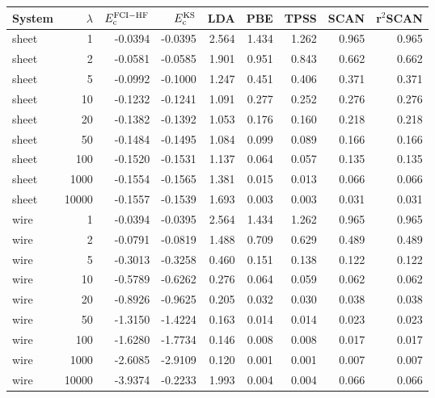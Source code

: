 \begin{tabular}{lrrrrrrrr}
\toprule
System & $\lambda$ & $E_{\rm c}^{\rm FCI-HF}$ & $E_{\rm c}^{\rm KS}$ & LDA & PBE & TPSS & SCAN & r$^2$SCAN \\
\midrule
sheet & 1 & -0.0394 & -0.0395 & 2.564 & 1.434 & 1.262 & 0.965 & 0.965 \\
sheet & 2 & -0.0581 & -0.0585 & 1.901 & 0.951 & 0.843 & 0.662 & 0.662 \\
sheet & 5 & -0.0992 & -0.1000 & 1.247 & 0.451 & 0.406 & 0.371 & 0.371 \\
sheet & 10 & -0.1232 & -0.1241 & 1.091 & 0.277 & 0.252 & 0.276 & 0.276 \\
sheet & 20 & -0.1382 & -0.1392 & 1.053 & 0.176 & 0.160 & 0.218 & 0.218 \\
sheet & 50 & -0.1484 & -0.1495 & 1.084 & 0.099 & 0.089 & 0.166 & 0.166 \\
sheet & 100 & -0.1520 & -0.1531 & 1.137 & 0.064 & 0.057 & 0.135 & 0.135 \\
sheet & 1000 & -0.1554 & -0.1565 & 1.381 & 0.015 & 0.013 & 0.066 & 0.066 \\
sheet & 10000 & -0.1557 & -0.1539 & 1.693 & 0.003 & 0.003 & 0.031 & 0.031 \\
\midrule
wire & 1 & -0.0394 & -0.0395 & 2.564 & 1.434 & 1.262 & 0.965 & 0.965 \\
wire & 2 & -0.0791 & -0.0819 & 1.488 & 0.709 & 0.629 & 0.489 & 0.489 \\
wire & 5 & -0.3013 & -0.3258 & 0.460 & 0.151 & 0.138 & 0.122 & 0.122 \\
wire & 10 & -0.5789 & -0.6262 & 0.276 & 0.064 & 0.059 & 0.062 & 0.062 \\
wire & 20 & -0.8926 & -0.9625 & 0.205 & 0.032 & 0.030 & 0.038 & 0.038 \\
wire & 50 & -1.3150 & -1.4224 & 0.163 & 0.014 & 0.014 & 0.023 & 0.023 \\
wire & 100 & -1.6280 & -1.7734 & 0.146 & 0.008 & 0.008 & 0.017 & 0.017 \\
wire & 1000 & -2.6085 & -2.9109 & 0.120 & 0.001 & 0.001 & 0.007 & 0.007 \\
wire & 10000 & -3.9374 & -0.2233 & 1.993 & 0.004 & 0.004 & 0.066 & 0.066 \\
\bottomrule
\end{tabular}
